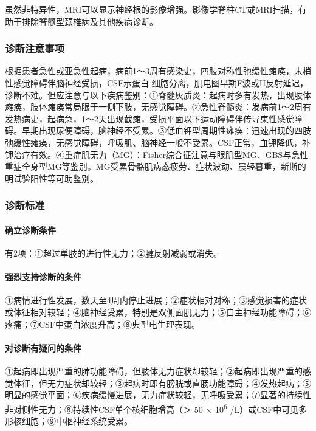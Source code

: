 虽然非特异性，MRI可以显示神经根的影像增强。影像学脊柱CT或MRI扫描，有助于排除脊髓型颈椎病及其他疾病诊断。

\subsubsection{诊断注意事项}

根据患者急性或亚急性起病，病前1～3周有感染史，四肢对称性弛缓性瘫痪，末梢性感觉障碍伴脑神经受损，CSF示蛋白-细胞分离，肌电图早期F波或H反射延迟，诊断不难。但应注意与以下疾病鉴别：①脊髓灰质炎：起病时多有发热，出现肢体瘫痪，肢体瘫痪常局限于一侧下肢，无感觉障碍。②急性脊髓炎：发病前1～2周有发热病史，起病急，1～2天出现截瘫，受损平面以下运动障碍伴传导束性感觉障碍。早期出现尿便障碍，脑神经不受累。③低血钾型周期性瘫痪：迅速出现的四肢弛缓性瘫痪，无感觉障碍，呼吸肌、脑神经一般不受累。CSF正常，血钾降低，补钾治疗有效。④重症肌无力（MG）：Fisher综合征注意与眼肌型MG、GBS与急性重症全身型MG等鉴别。MG受累骨骼肌病态疲劳、症状波动、晨轻暮重，新斯的明试验阳性等可助鉴别。

\subsubsection{诊断标准}

\paragraph{确立诊断条件}

有2项：①超过单肢的进行性无力；②腱反射减弱或消失。

\paragraph{强烈支持诊断的条件}

①病情进行性发展，数天至4周内停止进展；②症状相对对称；③感觉损害的症状或体征相对较轻；④脑神经受累，特别是双侧面肌无力；⑤自主神经功能障碍；⑥疼痛；⑦CSF中蛋白浓度升高；⑧典型电生理表现。

\paragraph{对诊断有疑问的条件}

①起病即出现严重的肺功能障碍，但肢体无力症状却较轻；②起病即出现严重的感觉体征，但无力症状却较轻；③起病时即有膀胱或直肠功能障碍；④发热起病；⑤明显的感觉平面；⑥疾病缓慢进展，无力症状较轻，无呼吸受累；⑦显著的持续性非对侧性无力；⑧持续性CSF单个核细胞增高（＞
50 × 10\textsuperscript{6}
/L）或CSF中可见多形核细胞；⑨中枢神经系统受累。


